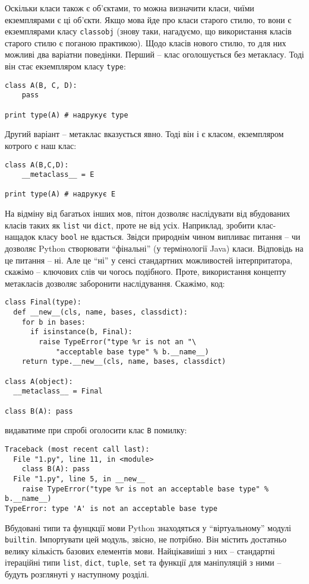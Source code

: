 \documentclass[a4paper, 12pt, onsedie]{article}
\begin{document}
Оскільки класи також є об'єктами, то можна визначити класи, чиїми екземплярами є ці об'єкти.
Якщо мова йде про класи старого стилю, то вони є екземплярами класу \texttt{classobj} (знову
таки, нагадуємо, що використання класів старого стилю є поганою практикою). Щодо класів 
нового стилю, то для них можливі два варіатни поведінки. Перший -- клас оголошується без 
метакласу. Тоді він стає екземпляром класу \texttt{type}:
\begin{verbatim}
class A(B, C, D):
    pass

print type(A) # надрукує type
\end{verbatim}
Другий варіант -- метаклас вказується явно. Тоді він і є класом, екземпляром котрого є наш
клас:
\begin{verbatim}
class A(B,C,D):
    __metaclass__ = E

print type(A) # надрукує E
\end{verbatim}

На відміну від багатьох інших мов, пітон дозволяє наслідувати від вбудованих класів таких 
як \texttt{list} чи \texttt{dict}, проте не від усіх. Наприклад, зробити клас-нащадок класу
\texttt{bool} не вдасться. Звідси природнім чином випливає питання -- чи дозволяє Python
створювати ``фінальні'' (у термінології Java) класи. Відповідь на це питання -- ні. Але це
``ні'' у сенсі стандартних можливостей інтерпритатора, скажімо -- ключових слів чи чогось
подібного. Проте, використання концепту метакласів дозволяє заборонити наслідування.
Скажімо, код:

\begin{verbatim}
class Final(type):
  def __new__(cls, name, bases, classdict):
    for b in bases:
      if isinstance(b, Final):
        raise TypeError("type %r is not an "\
            "acceptable base type" % b.__name__)
    return type.__new__(cls, name, bases, classdict)

class A(object):
  __metaclass__ = Final

class B(A): pass
\end{verbatim}
видаватиме при спробі оголосити клас \texttt{B} помилку:

\begin{verbatim}
Traceback (most recent call last):
  File "1.py", line 11, in <module>
    class B(A): pass
  File "1.py", line 5, in __new__
    raise TypeError("type %r is not an acceptable base type" % b.__name__)
TypeError: type 'A' is not an acceptable base type
\end{verbatim}

Вбудовані типи та фунцкції мови Python знаходяться у ``віртуальному'' модулі
\texttt{ \textunderscore \textunderscore builtin\textunderscore \textunderscore }. Імпортувати цей
модуль, звісно, не потрібно. Він містить достатньо велику кількість 
базових елементів мови. Найцікавиіші з них -- стандартні ітераційні типи
\texttt{list}, \texttt{dict}, \texttt{tuple}, \texttt{set} та функції для 
маніпуляцій з ними -- будуть розглянуті у наступному розділі. 
\end{document}
